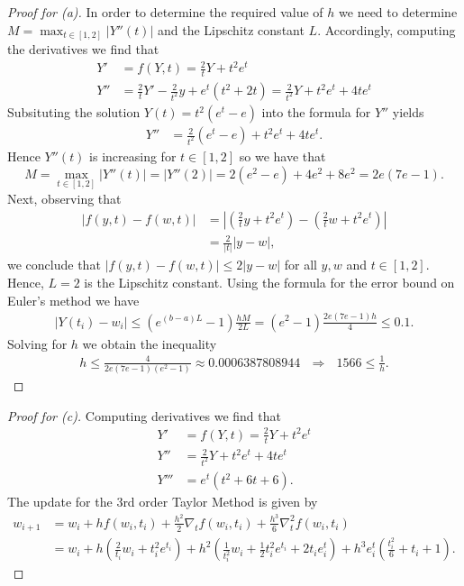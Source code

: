 \documentclass[8pt]{article}
\theoremstyle{definition}
\begin{document}
\begin{proof}[Proof for (a)]
In order to determine the required value of $h$ we need to determine $M = \max_{t \in [1, 2]} | Y''(t) |$ and the Lipschitz constant $L$. Accordingly, computing the derivatives we find that
\begin{align*}
Y' &= f(Y, t) = \frac{2}{t} Y + t^2 e^t \\
Y'' &= \frac{2}{t} Y' - \frac{2}{t^2} y + e^t (t^2 + 2t) = \frac{2}{t^2} Y + t^2 e^t + 4t e^t
\end{align*}
Subsituting the solution $Y(t) = t^2 (e^t - e)$ into the formula for $Y''$ yields
\begin{align*}
Y'' &= \frac{2}{t^2} (e^t - e) + t^2 e^t + 4t e^t.
\end{align*}
Hence $Y''(t)$ is increasing for $t \in [1, 2]$ so we have that $$M = \max_{t \in [1, 2]} | Y''(t) | = | Y'' (2) | = 2 (e^2 - e) + 4 e^2 + 8 e^2 = 2e (7e - 1).$$ Next, observing that 
\begin{align*}
|f(y,t) - f(w,t)| &= \left| \left( \frac{2}{t} y + t^2 e^t \right) - \left( \frac{2}{t} w + t^2 e^t \right) \right| \\
&= \frac{2}{|t|} |y - w|,
\end{align*}
we conclude that $|f(y,t) - f(w,t)| \leq 2 |y - w|$ for all $y, w$ and $t \in [1, 2]$. Hence, $L = 2$ is the Lipschitz constant. Using the formula for the error bound on Euler's method we have
\begin{align*}
\left| Y(t_i) - w_i \right| \leq \left( e^{(b-a)L} - 1 \right) \frac{hM}{2L} = (e^2 - 1) \frac{2e (7e - 1) h}{4} \leq 0.1.
\end{align*}
Solving for $h$ we obtain the inequality
\begin{align*}
h \leq \frac{4}{2e(7e - 1)(e^2 - 1)} \approx 0.0006387808944 \ \ \ \Longrightarrow \ \ \ 1566 \leq \frac{1}{h}.
\end{align*}
\end{proof}

\begin{proof}[Proof for (c)]
Computing derivatives we find that
\begin{align*}
Y' &= f(Y, t) = \frac{2}{t} Y + t^2 e^t \\
Y'' &= \frac{2}{t^2} Y + t^2 e^t + 4t e^t \\
Y''' &= e^t (t^2 + 6t + 6).
\end{align*}
The update for the 3rd order Taylor Method is given by 
\begin{align*}
w_{i+1} &= w_i + h f(w_i, t_i) + \frac{h^2}{2} \nabla_t f(w_i, t_i) + \frac{h^3}{6} \nabla_t^2 f(w_i, t_i) \\
&= w_i + h \left( \frac{2}{t_i} w_i + t_i^2 e^{t_i} \right) + h^2 \left( \frac{1}{t_i^2} w_i + \frac{1}{2} t_i^2 e^{t_i} + 2t_i e^t_i \right) + h^3 e^t_i \left( \frac{t_i^2}{6} + t_i + 1  \right).
\end{align*}
\end{proof}
\end{document}
